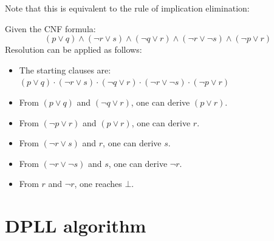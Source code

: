 \begin{description}
\begin{descriptionlist}
                Note that this is equivalent to the rule of implication elimination:\\
                \begin{minipage}{0.4\linewidth}
                    \begin{prooftree}
                    \end{prooftree}
                \end{minipage}
                \begin{minipage}{0.4\linewidth}
                    \begin{prooftree}
                    \end{prooftree}
                \end{minipage}
        \end{descriptionlist}
\end{description}

\begin{example}
    Given the CNF formula:
    \[ (p \vee q) \land (\lnot r \vee s) \land (\lnot q \vee r) \land (\lnot r \vee \lnot s) \land (\lnot p \vee r) \]
    Resolution can be applied as follows:
    \begin{itemize}
        \item The starting clauses are:
            $(p \vee q) \cdot (\lnot r \vee s) \cdot (\lnot q \vee r) \cdot (\lnot r \vee \lnot s) \cdot (\lnot p \vee r)$
        \item From $(p \vee q)$ and $(\lnot q \vee r)$, one can derive $(p \vee r)$.
        \item From $(\lnot p \vee r)$ and $(p \vee r)$, one can derive $r$.
        \item From $(\lnot r \vee s)$ and $r$, one can derive $s$.
        \item From $(\lnot r \vee \lnot s)$ and $s$, one can derive $\lnot r$.
        \item From $r$ and $\lnot r$, one reaches $\bot$.
    \end{itemize}
\end{example}



\section{DPLL algorithm}

